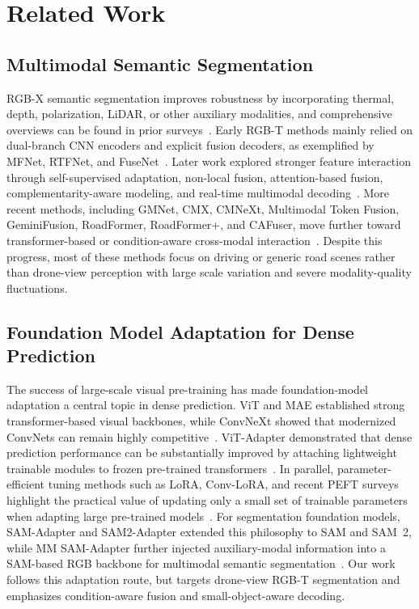 \section{Related Work}

\subsection{Multimodal Semantic Segmentation}

RGB-X semantic segmentation improves robustness by incorporating thermal, depth, polarization, LiDAR, or other auxiliary modalities, and comprehensive overviews can be found in prior surveys~\cite{zhang2021multimodalsurvey}. Early RGB-T methods mainly relied on dual-branch CNN encoders and explicit fusion decoders, as exemplified by MFNet, RTFNet, and FuseNet~\cite{ha2017mfnet,sun2019rtfnet,hazirbas2016fusenet}. Later work explored stronger feature interaction through self-supervised adaptation, non-local fusion, attention-based fusion, complementarity-aware modeling, and real-time multimodal decoding~\cite{valada2020selfsupervised,yan2021nlfnet,xu2021attentionfusion,wu2022complementarity,sun2020realtimefusion}. More recent methods, including GMNet, CMX, CMNeXt, Multimodal Token Fusion, GeminiFusion, RoadFormer, RoadFormer+, and CAFuser, move further toward transformer-based or condition-aware cross-modal interaction~\cite{zhou2021gmnet,zhang2023cmx,zhang2023deliver,wang2022multimodaltoken,jia2024geminifusion,li2024roadformer,huang2025roadformerplus,broedermann2025cafuser}. Despite this progress, most of these methods focus on driving or generic road scenes rather than drone-view perception with large scale variation and severe modality-quality fluctuations.

\subsection{Foundation Model Adaptation for Dense Prediction}

The success of large-scale visual pre-training has made foundation-model adaptation a central topic in dense prediction. ViT and MAE established strong transformer-based visual backbones, while ConvNeXt showed that modernized ConvNets can remain highly competitive~\cite{dosovitskiy2021vit,he2022mae,liu2022convnext}. ViT-Adapter demonstrated that dense prediction performance can be substantially improved by attaching lightweight trainable modules to frozen pre-trained transformers~\cite{chen2023vitadapter}. In parallel, parameter-efficient tuning methods such as LoRA, Conv-LoRA, and recent PEFT surveys highlight the practical value of updating only a small set of trainable parameters when adapting large pre-trained models~\cite{hu2022lora,zhong2024convlora,xin2024peftsurvey}. For segmentation foundation models, SAM-Adapter and SAM2-Adapter extended this philosophy to SAM and SAM~2, while MM SAM-Adapter further injected auxiliary-modal information into a SAM-based RGB backbone for multimodal semantic segmentation~\cite{chen2023samadapter,chen2024sam2adapter,curti2025mmsamadapter}. Our work follows this adaptation route, but targets drone-view RGB-T segmentation and emphasizes condition-aware fusion and small-object-aware decoding.

